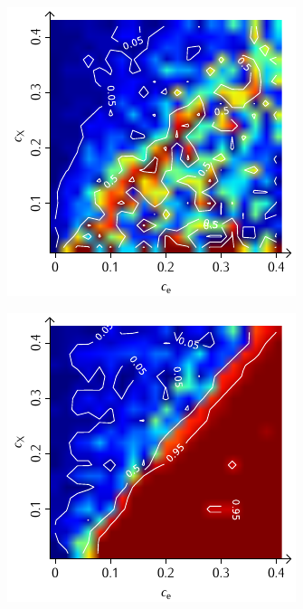 \documentclass[a4paper, 10pt, twoside, openany]{book} %
\begin{document}
\begin{figure}
\begin{minipage}[t]{0.48\textwidth}
			\label{F_random_P}
		\end{minipage}
		\hfill
		\begin{minipage}[t]{0.48\textwidth}
			\includegraphics[width=\textwidth]{Abbildungen/Phasendiagramme/Konturen/F_penalty_random_P.pdf}
			\label{F_penalty_random_P}
		\end{minipage}
		\begin{minipage}[t]{0.48\textwidth}
			\includegraphics[width=\textwidth]{Abbildungen/Phasendiagramme/Konturen/F_individual_P.pdf}

\end{minipage}
\end{figure}
\end{document}
